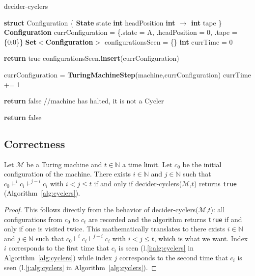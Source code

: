 \begin{algorithm}
  \caption{{\sc decider-cyclers}}\label{alg:cyclers}

  \begin{algorithmic}[1]

    \State \textbf{struct} Configuration \{
    \State \tabi\textbf{State} state
    \State \tabi\textbf{int} headPosition
    \State \tabi\textbf{int $\boldsymbol{\to}$ int} tape
    \State \}
    \State
    \State \textbf{Configuration} currConfiguration = \{.state = \textcolor{colorA}{A}, .headPosition = 0, .tape = \{0:0\}\}
    \State \textbf{Set$\boldsymbol{<}$Configuration$\boldsymbol{>}$} configurationsSeen = \{\}
    \State \textbf{int} currTime = 0

     \label{j:alg:cyclers}
    \State \textbf{return} true
    \EndIf
    \State configurationsSeen.\textbf{insert}(currConfiguration) \label{i:alg:cyclers}

    \State currConfiguration = \textbf{TuringMachineStep}(machine,currConfiguration)
    \State currTime += 1


    \State \textbf{return} false //machine has halted, it is not a Cycler
    \EndIf
    \EndWhile

    \State \textbf{return} false
    \EndProcedure

  \end{algorithmic}
\end{algorithm}

\subsection{Correctness}



\begin{theorem}\label{th:cyclers} Let $\mathcal{M}$ be a Turing machine and $t \in \mathbb{N}$ a time limit. Let $c_0$ be the initial configuration of the machine. There exists $i\in\mathbb{N}$ and $j\in\mathbb{N}$ such that $c_0 \vdash^i c_i \vdash^{j-i} c_i$ with $i < j \leq t$ if and only if {\sc decider-cyclers}($\mathcal{M}$,$t$) returns \texttt{true} (Algorithm~\ref{alg:cyclers}).
\end{theorem}
\begin{proof}
  This follows directly from the behavior of {\sc decider-cyclers}($\mathcal{M}$,$t$): all configurations from $c_0$ to $c_t$ are recorded and the algorithm returns \texttt{true} if and only if one is visited twice. This mathematically translates to
  there exists $i\in\mathbb{N}$ and $j\in\mathbb{N}$ such that $c_0 \vdash^i c_i \vdash^{j-i} c_i$ with $i < j \leq t$, which is what we want. Index $i$ corresponds to the first time that $c_i$ is seen (l.\ref{i:alg:cyclers} in Algorithm~\ref{alg:cyclers}) while index $j$ corresponds to the second time that $c_i$ is seen (l.\ref{j:alg:cyclers} in Algorithm~\ref{alg:cyclers}).
\end{proof}

